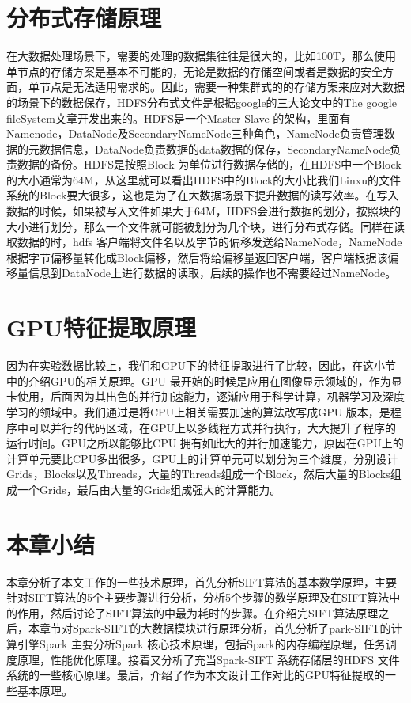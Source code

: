 \section{分布式存储原理}
在大数据处理场景下，需要的处理的数据集往往是很大的，比如100T，那么使用单节点的存储方案是基本不可能的，无论是数据的存储空间或者是数据的安全方面，单节点是无法适用需求的。因此，需要一种集群式的的存储方案来应对大数据的场景下的数据保存，HDFS分布式文件是根据google的三大论文中的The google fileSystem文章开发出来的。HDFS是一个Master-Slave 的架构，里面有Namenode，DataNode及SecondaryNameNode三种角色，NameNode负责管理数据的元数据信息，DataNode负责数据的data数据的保存，SecondaryNameNode负责数据的备份。HDFS是按照Block 为单位进行数据存储的，在HDFS中一个Block的大小通常为64M，从这里就可以看出HDFS中的Block的大小比我们Linxu的文件系统的Block要大很多，这也是为了在大数据场景下提升数据的读写效率。在写入数据的时候，如果被写入文件如果大于64M，HDFS会进行数据的划分，按照块的大小进行划分，那么一个文件就可能被划分为几个块，进行分布式存储。同样在读取数据的时，hdfs 客户端将文件名以及字节的偏移发送给NameNode，NameNode根据字节偏移量转化成Block偏移，然后将给偏移量返回客户端，客户端根据该偏移量信息到DataNode上进行数据的读取，后续的操作也不需要经过NameNode。
\section{GPU特征提取原理}
因为在实验数据比较上，我们和GPU下的特征提取进行了比较，因此，在这小节中的介绍GPU的相关原理。GPU 最开始的时候是应用在图像显示领域的，作为显卡使用，后面因为其出色的并行加速能力，逐渐应用于科学计算，机器学习及深度学习的领域中。我们通过是将CPU上相关需要加速的算法改写成GPU 版本，是程序中可以并行的代码区域，在GPU上以多线程方式并行执行，大大提升了程序的运行时间。GPU之所以能够比CPU 拥有如此大的并行加速能力，原因在GPU上的计算单元要比CPU多出很多，GPU上的计算单元可以划分为三个维度，分别设计Grids，Blocks以及Threads，大量的Threads组成一个Block，然后大量的Blocks组成一个Grids，最后由大量的Grids组成强大的计算能力。
\section{本章小结}
本章分析了本文工作的一些技术原理，首先分析SIFT算法的基本数学原理，主要针对SIFT算法的5个主要步骤进行分析，分析5个步骤的数学原理及在SIFT算法中的作用，然后讨论了SIFT算法的中最为耗时的步骤。在介绍完SIFT算法原理之后，本章节对Spark-SIFT的大数据模块进行原理分析，首先分析了park-SIFT的计算引擎Spark 主要分析Spark 核心技术原理，包括Spark的内存编程原理，任务调度原理，性能优化原理。接着又分析了充当Spark-SIFT 系统存储层的HDFS 文件系统的一些核心原理。最后，介绍了作为本文设计工作对比的GPU特征提取的一些基本原理。


